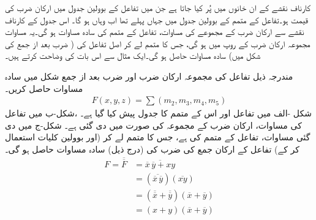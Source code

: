  کارناف نقشے کے ان خانوں میں  پُر کیا جاتا ہے جن میں تفاعل کے بوولین جدول میں ارکان ضرب کی قیمت  ہو۔تفاعل کے متمم کے بوولین جدول میں جہاں پہلے  تھا اب وہاں  ہو گا۔ اس جدول کے کارناف نقشے سے ارکان ضرب کے مجموعے کی مساوات، تفاعل کے متمم کی سادہ مساوات ہو گی۔یہ مساوات مجموعہ ارکان ضرب کے روپ میں ہو گی، جس کا متمم لے کر اصل تفاعل کی ( ضرب بعد از جمع کی شکل  میں) سادہ مساوات حاصل ہو گی۔ایک مثال سے اس بات کی وضاحت کرتے ہیں۔

مندرجہ ذیل تفاعل کی  مجموعہ ارکان ضرب اور  ضرب بعد از جمع  شکل میں سادہ مساوات حاصل کریں۔
\begin{align*}
F(x,y,z)=\sum(m_2,m_3,m_4,m_5)
\end{align*}
\quad
شکل -الف میں تفاعل اور اس کے متمم کا جدول پیش کیا گیا ہے۔ ،شکل-ب میں تفاعل کی مساوات، ارکان ضرب کے مجموعہ کی صورت میں دی گئی ہے۔ شکل-ج میں دی گئی مساوات، تفاعل کے متمم کی ہے، جس کا متمم لے کر (اور بوولین کلیات استعمال کر کے) تفاعل کے ارکان جمع کی ضرب کی (درج ذیل) سادہ مساوات حاصل ہو گی۔
\begin{align*}
F=\overline{\overline{F}}&=\overline{\overline{x}\,\overline{y}+xy}\\
&=(\overline{\overline{x}\,\overline{y}})(\overline{xy})\\
&=(\overline{\overline{x}}+\overline{\overline{y}})(\overline{x}+\overline{y})\\
&=(x+y)(\overline{x}+\overline{y})
\end{align*}
%
